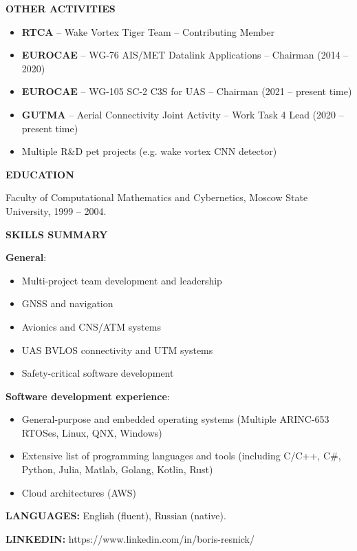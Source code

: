 \documentclass[a4paper]{article}
\begin{document}
    \vspace{3mm}
    \textbf{OTHER ACTIVITIES}
    \vspace{3mm}

	\begin{itemize}
	    \setlength{\itemindent}{.5cm}	
	    \item \textbf{RTCA} -- Wake Vortex Tiger Team -- Contributing Member
	    \item \textbf{EUROCAE} -- WG-76 AIS/MET Datalink Applications -- Chairman (2014 -- 2020)
	    \item \textbf{EUROCAE} -- WG-105 SC-2 C3S for UAS -- Chairman (2021 -- present time)
	    \item \textbf{GUTMA} -- Aerial Connectivity Joint Activity -- Work Task 4 Lead (2020 -- present time)
	    \item Multiple R\&D pet projects (e.g. wake vortex CNN detector)
    \end{itemize}
    \vspace{3mm}
    
    \textbf{EDUCATION}
    \vspace{3mm}
    
    Faculty of Computational Mathematics and Cybernetics, Moscow State University, 1999 -- 2004.
    \vspace{5mm}
    
    \textbf{SKILLS SUMMARY}
    \vspace{3mm}
    
    \textbf{General}:
	\begin{itemize}
		\item Multi-project team development and leadership
		\item GNSS and navigation
		\item Avionics and CNS/ATM systems
		\item UAS BVLOS connectivity and UTM systems
		\item Safety-critical software development
	\end{itemize}
    \vspace{3mm}
    
    \textbf{Software development experience}: 
	\begin{itemize}
		\item General-purpose and embedded operating systems (Multiple ARINC-653 RTOSes, Linux, QNX, Windows)
		\item Extensive list of programming languages and tools (including C/C++, C\#, Python, Julia, Matlab, Golang, Kotlin, Rust)
		\item Cloud architectures (AWS)
	\end{itemize}
    \vspace{5mm}
    
    \textbf{LANGUAGES:} English (fluent), Russian (native).

    \vspace{5mm}

	\textbf{LINKEDIN:} https://www.linkedin.com/in/boris-resnick/
\end{document}
